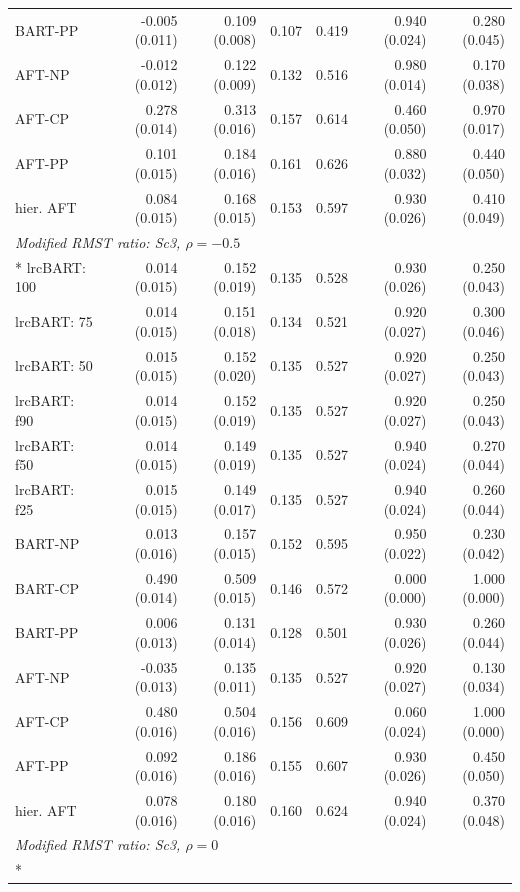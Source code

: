 \begin{landscape}
\begin{longtable}{lrrrrrr}
BART-PP & -0.005 (0.011) & 0.109 (0.008) & 0.107 & 0.419 & 0.940 (0.024) & 0.280 (0.045) \\
AFT-NP & -0.012 (0.012) & 0.122 (0.009) & 0.132 & 0.516 & 0.980 (0.014) & 0.170 (0.038) \\
AFT-CP & 0.278 (0.014) & 0.313 (0.016) & 0.157 & 0.614 & 0.460 (0.050) & 0.970 (0.017) \\
AFT-PP & 0.101 (0.015) & 0.184 (0.016) & 0.161 & 0.626 & 0.880 (0.032) & 0.440 (0.050) \\
hier. AFT & 0.084 (0.015) & 0.168 (0.015) & 0.153 & 0.597 & 0.930 (0.026) & 0.410 (0.049) \\
\multicolumn{7}{l}{\strut\textit{Modified RMST ratio: Sc3, $\rho=-0.5$}}\\*
lrcBART: 100 & 0.014 (0.015) & 0.152 (0.019) & 0.135 & 0.528 & 0.930 (0.026) & 0.250 (0.043) \\
lrcBART: 75 & 0.014 (0.015) & 0.151 (0.018) & 0.134 & 0.521 & 0.920 (0.027) & 0.300 (0.046) \\
lrcBART: 50 & 0.015 (0.015) & 0.152 (0.020) & 0.135 & 0.527 & 0.920 (0.027) & 0.250 (0.043) \\
lrcBART: f90 & 0.014 (0.015) & 0.152 (0.019) & 0.135 & 0.527 & 0.920 (0.027) & 0.250 (0.043) \\
lrcBART: f50 & 0.014 (0.015) & 0.149 (0.019) & 0.135 & 0.527 & 0.940 (0.024) & 0.270 (0.044) \\
lrcBART: f25 & 0.015 (0.015) & 0.149 (0.017) & 0.135 & 0.527 & 0.940 (0.024) & 0.260 (0.044) \\
BART-NP & 0.013 (0.016) & 0.157 (0.015) & 0.152 & 0.595 & 0.950 (0.022) & 0.230 (0.042) \\
BART-CP & 0.490 (0.014) & 0.509 (0.015) & 0.146 & 0.572 & 0.000 (0.000) & 1.000 (0.000) \\
BART-PP & 0.006 (0.013) & 0.131 (0.014) & 0.128 & 0.501 & 0.930 (0.026) & 0.260 (0.044) \\
AFT-NP & -0.035 (0.013) & 0.135 (0.011) & 0.135 & 0.527 & 0.920 (0.027) & 0.130 (0.034) \\
AFT-CP & 0.480 (0.016) & 0.504 (0.016) & 0.156 & 0.609 & 0.060 (0.024) & 1.000 (0.000) \\
AFT-PP & 0.092 (0.016) & 0.186 (0.016) & 0.155 & 0.607 & 0.930 (0.026) & 0.450 (0.050) \\
hier. AFT & 0.078 (0.016) & 0.180 (0.016) & 0.160 & 0.624 & 0.940 (0.024) & 0.370 (0.048) \\
\multicolumn{7}{l}{\strut\textit{Modified RMST ratio: Sc3, $\rho=0$}}\\*

\end{longtable}
\end{landscape}
